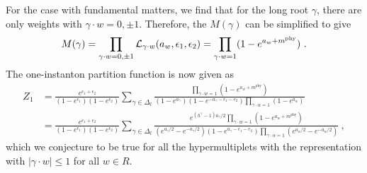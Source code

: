 \documentclass[letterpaper, 11pt]{article}
\newcommand{\nn}{\nonumber}
\def\CL{{\cal L}}
\def\a{\alpha}
\def\g{\gamma}
\def\e{\epsilon}
\begin{document}
For the case with fundamental matters, we find that for the long root $\g$, there are only weights with $\g \cdot w = 0, \pm 1$. Therefore, the $M(\g)$ can be simplified to give
\begin{align}
 M(\g) = \prod_{\g \cdot w = 0, \pm 1} \CL_{\g \cdot w} (a_w, \e_1, \e_2) = \prod_{\g \cdot w = 1} (1-e^{a_w + m^{\textrm{phy} }}) \ . 
\end{align}
The one-instanton partition function is now given as
\begin{align}
Z_1 &= \frac{e^{\e_1+\e_2} }{(1-e^{\e_1})(1-e^{\e_2})} \sum_{\g \in \Delta_l} \frac{\prod_{\g \cdot w = 1} (1-e^{a_w + m^{\textrm{phy} }}) }{ (1 - e^{a_\g})(1-e^{-a_\g-\e_1-e_2}) \prod_{\g \cdot \a = 1} (1-e^{a_\a })} \\
&= \frac{e^{\e_1+\e_2} }{(1-e^{\e_1})(1-e^{\e_2})} \sum_{\g \in \Delta_l} \frac{e^{(h^\vee -1)a_\g/2} \prod_{\g \cdot w = 1} (1-e^{a_w + m^{\textrm{phy} }}) }{ (e^{a_\g/2} - e^{-a_\g/2})(1-e^{a_\g-\e_1-e_2}) {\prod_{\g \cdot \a = 1} (e^{a_\a/2}-e^{-a_\a/2 })} } \ , \nn
\end{align}
which we conjecture to be true for all the hypermultiplets with the representation with $|\g \cdot w| \le 1$ for all $w \in R$. 
\end{document}
